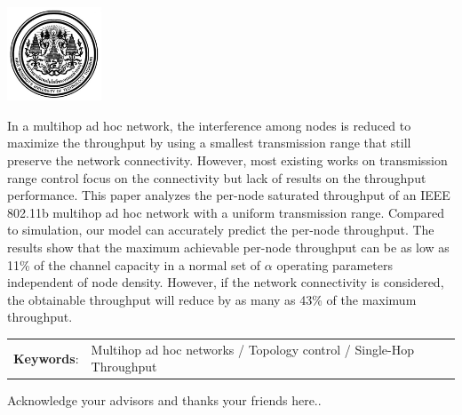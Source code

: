 \documentclass[12pt,oneside,openright,a4paper]{explo-english-project}
\begin{document}
\pdfstringdefDisableCommands{%
\let\MakeUppercase\relax
}
\begin{center}
  \includegraphics[width=2.8cm]{logo02.jpg}
\end{center}
\vspace*{-1cm}

\maketitlepage

\abstract

In a multihop ad hoc network, the interference among nodes is
  reduced to maximize the throughput by using a smallest transmission
  range that still preserve the network connectivity. However, most
  existing works on transmission range control focus on the
  connectivity but lack of results on the throughput performance. This
  paper analyzes the per-node saturated throughput of an IEEE 802.11b
  multihop ad hoc network with a uniform transmission range. Compared
  to simulation, our model can accurately predict the per-node
  throughput.  The results show that the maximum achievable per-node
  throughput can be as low as 11\% of the channel capacity in a normal
  set of $\alpha$ operating parameters independent of node density. However, if
  the network connectivity is considered, the obtainable throughput
  will reduce by as many as 43\% of the maximum throughput. 

\begin{flushleft}
\begin{tabular*}{\textwidth}{@{}lp{}}
\textbf{Keywords}: & Multihop ad hoc networks / Topology control / Single-Hop Throughput
\end{tabular*}
\end{flushleft}
\endabstract


\preface
Acknowledge your advisors and thanks your friends here..
\end{document}

